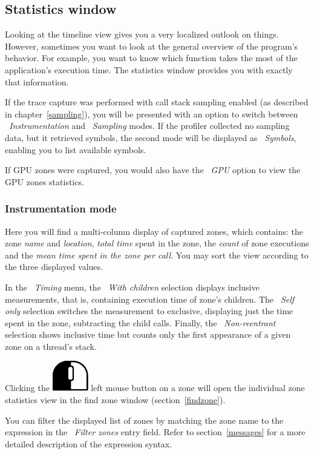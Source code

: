 \documentclass[hidelinks,titlepage,a4paper]{article}
\newcommand{\LMB}{\includegraphics[height=.8\baselineskip]{icons/lmb}}
\begin{document}
\subsection{Statistics window}
\label{statistics}

Looking at the timeline view gives you a very localized outlook on things. However, sometimes you want to look at the general overview of the program's behavior. For example, you want to know which function takes the most of the application's execution time. The statistics window provides you with exactly that information.

If the trace capture was performed with call stack sampling enabled (as described in chapter~\ref{sampling}), you will be presented with an option to switch between \emph{\faSyringe{}~Instrumentation} and \emph{\faEyeDropper{}~Sampling} modes. If the profiler collected no sampling data, but it retrieved symbols, the second mode will be displayed as \emph{\faPuzzlePiece{}~Symbols}, enabling you to list available symbols.

If GPU zones were captured, you would also have the \emph{\faEye{}~GPU} option to view the GPU zones statistics.

\subsubsection{Instrumentation mode}

Here you will find a multi-column display of captured zones, which contains: the zone \emph{name} and \emph{location}, \emph{total time} spent in the zone, the \emph{count} of zone executions and the \emph{mean time spent in the zone per call}. You may sort the view according to the three displayed values.

In the \emph{~Timing} menu, the \emph{~With children} selection displays inclusive measurements, that is, containing execution time of zone's children. The \emph{~Self only} selection switches the measurement to exclusive, displaying just the time spent in the zone, subtracting the child calls. Finally, the \emph{~Non-reentrant} selection shows inclusive time but counts only the first appearance of a given zone on a thread's stack.

Clicking the \LMB{} left mouse button on a zone will open the individual zone statistics view in the find zone window (section~\ref{findzone}).

You can filter the displayed list of zones by matching the zone name to the expression in the \emph{\faFilter{}~Filter zones} entry field. Refer to section~\ref{messages} for a more detailed description of the expression syntax.
\end{document}
